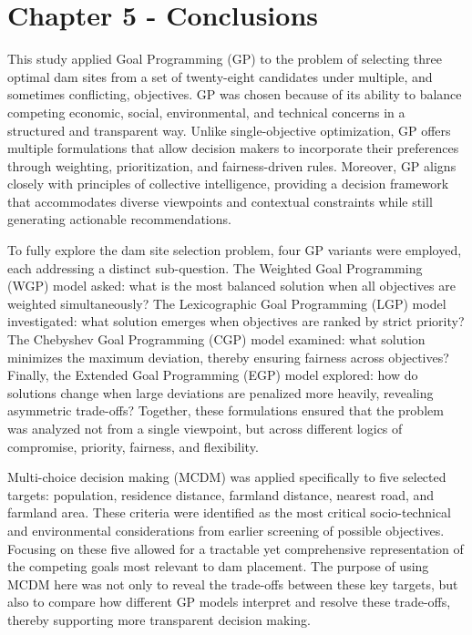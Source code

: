 \section{Chapter 5 - Conclusions}\label{sec:conclusions}
This study applied Goal Programming (GP) to the problem of selecting three optimal dam sites from a set of twenty-eight candidates under multiple, and sometimes conflicting, objectives. GP was chosen because of its ability to balance competing economic, social, environmental, and technical concerns in a structured and transparent way. Unlike single-objective optimization, GP offers multiple formulations that allow decision makers to incorporate their preferences through weighting, prioritization, and fairness-driven rules. Moreover, GP aligns closely with principles of collective intelligence, providing a decision framework that accommodates diverse viewpoints and contextual constraints while still generating actionable recommendations.  

To fully explore the dam site selection problem, four GP variants were employed, each addressing a distinct sub-question. The Weighted Goal Programming (WGP) model asked: what is the most balanced solution when all objectives are weighted simultaneously? The Lexicographic Goal Programming (LGP) model investigated: what solution emerges when objectives are ranked by strict priority? The Chebyshev Goal Programming (CGP) model examined: what solution minimizes the maximum deviation, thereby ensuring fairness across objectives? Finally, the Extended Goal Programming (EGP) model explored: how do solutions change when large deviations are penalized more heavily, revealing asymmetric trade-offs? Together, these formulations ensured that the problem was analyzed not from a single viewpoint, but across different logics of compromise, priority, fairness, and flexibility.

Multi-choice decision making (MCDM) was applied specifically to five selected targets: population, residence distance, farmland distance, nearest road, and farmland area. These criteria were identified as the most critical socio-technical and environmental considerations from earlier screening of possible objectives. Focusing on these five allowed for a tractable yet comprehensive representation of the competing goals most relevant to dam placement. The purpose of using MCDM here was not only to reveal the trade-offs between these key targets, but also to compare how different GP models interpret and resolve these trade-offs, thereby supporting more transparent decision making.

